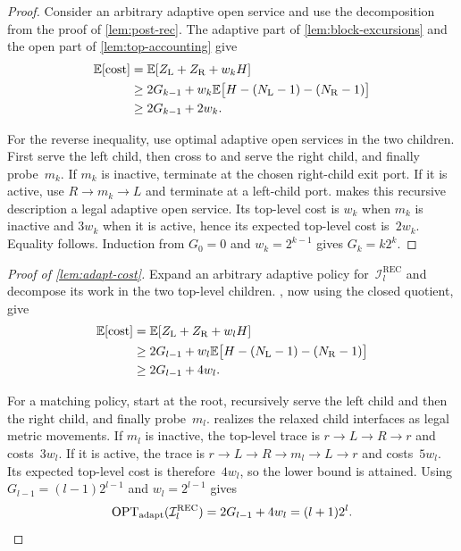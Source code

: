 \documentclass[12pt,a4paper,oneside]{report}
\begin{document}
\begin{proof}
Consider an arbitrary adaptive open service and use the decomposition from the
proof of \cref{lem:post-rec}.  The adaptive part of
\cref{lem:block-excursions} and the open part of
\cref{lem:top-accounting} give
\begin{align*}
    \mathbb{E}[\operatorname{cost}]
    &=\mathbb{E}[Z_{\mathrm L}+Z_{\mathrm R}+w_kH]\\
    &\ge2G_{k-1}
      +w_k\mathbb{E}\bigl[H-(N_{\mathrm L}-1)-(N_{\mathrm R}-1)\bigr]\\
    &\ge2G_{k-1}+2w_k.
\end{align*}

For the reverse inequality, use optimal adaptive open services in the two
children.  First serve the left child, then cross to and serve the right
child, and finally probe~$m_k$.  If $m_k$ is inactive, terminate at the chosen
right-child exit port.  If it is active, use $R\to m_k\to L$ and terminate at
a left-child port.   makes this recursive
description a legal adaptive open service.  Its top-level cost is $w_k$ when
$m_k$ is inactive and $3w_k$ when it is active, hence its expected top-level
cost is~$2w_k$.  Equality follows.  Induction from $G_0=0$ and
$w_k=2^{k-1}$ gives $G_k=k2^k$.
\end{proof}

\begin{proof}[Proof of \cref{lem:adapt-cost}]
Expand an arbitrary adaptive policy for~$\mathcal{I}_l^{\mathrm{REC}}$ and
decompose its work in the two top-level children.
, now
using the closed quotient, give
\begin{align*}
    \mathbb{E}[\operatorname{cost}]
    &=\mathbb{E}[Z_{\mathrm L}+Z_{\mathrm R}+w_lH]\\
    &\ge2G_{l-1}
      +w_l\mathbb{E}\bigl[H-(N_{\mathrm L}-1)-(N_{\mathrm R}-1)\bigr]\\
    &\ge2G_{l-1}+4w_l.
\end{align*}

For a matching policy, start at the root, recursively serve the left child
and then the right child, and finally probe~$m_l$.
 realizes the relaxed child interfaces as legal
metric movements.  If $m_l$ is inactive, the top-level trace is
$r\to L\to R\to r$ and costs~$3w_l$.  If it is active, the trace is
$r\to L\to R\to m_l\to L\to r$ and costs~$5w_l$.  Its expected top-level
cost is therefore~$4w_l$, so the lower bound is attained.  Using
$G_{l-1}=(l-1)2^{l-1}$ and $w_l=2^{l-1}$ gives
\begin{equation}\label{eq:adapt-value-recursive}
    \operatorname{OPT}_\mathrm{adapt}(\mathcal{I}_l^{\mathrm{REC}})
    =
    2G_{l-1}+4w_l
    =
    (l+1)2^l.
\end{equation}
\end{proof}
\end{document}
